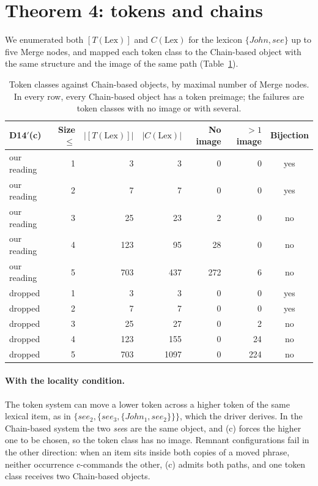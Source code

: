 \documentclass[11pt]{article}
\newcommand{\pf}[1]{\textit{#1}}
\newcommand{\Def}[1]{D#1}
\theoremstyle{definition}
\theoremstyle{plain}
\begin{document}
\section{Theorem 4: tokens and chains}
\label{sec:t4}

We enumerated both $[T(\mathrm{Lex})]$ and $C(\mathrm{Lex})$ for the lexicon
$\{\mathit{John},\mathit{see}\}$ up to five Merge nodes, and mapped each
token class to the Chain-based object with the same structure and the image
of the same path (Table~\ref{tab:t4}).

\begin{table}[t]
\centering
\small
\begin{tabular}{@{}lrrrrrc@{}}
\toprule
\Def{14}$'$(c) & Size $\le$ & $|[T(\mathrm{Lex})]|$ & $|C(\mathrm{Lex})|$ & No image & $>1$ image & Bijection \\
\midrule
our reading & 1 &   3 &    3 &   0 &   0 & yes \\
our reading & 2 &   7 &    7 &   0 &   0 & yes \\
our reading & 3 &  25 &   23 &   2 &   0 & no \\
our reading & 4 & 123 &   95 &  28 &   0 & no \\
our reading & 5 & 703 &  437 & 272 &   6 & no \\
\midrule
dropped     & 1 &   3 &    3 &   0 &   0 & yes \\
dropped     & 2 &   7 &    7 &   0 &   0 & yes \\
dropped     & 3 &  25 &   27 &   0 &   2 & no \\
dropped     & 4 & 123 &  155 &   0 &  24 & no \\
dropped     & 5 & 703 & 1097 &   0 & 224 & no \\
\bottomrule
\end{tabular}
\caption{Token classes against Chain-based objects, by maximal number of
Merge nodes. In every row, every Chain-based object has a token preimage; the
failures are token classes with no image or with several.}
\label{tab:t4}
\end{table}

\paragraph{With the locality condition.}
The token system can move a lower token across a higher token of the same
lexical item, as in $\{\mathit{see}_2,\{\mathit{see}_3,\{\mathit{John}_1,
\mathit{see}_2\}\}\}$, which the driver derives. In the Chain-based system
the two \pf{see}s are the same object, and (c) forces the higher one to be
chosen, so the token class has no image. Remnant configurations fail in the
other direction: when an item sits inside both copies of a moved phrase,
neither occurrence c-commands the other, (c) admits both paths, and one token
class receives two Chain-based objects.
\end{document}
